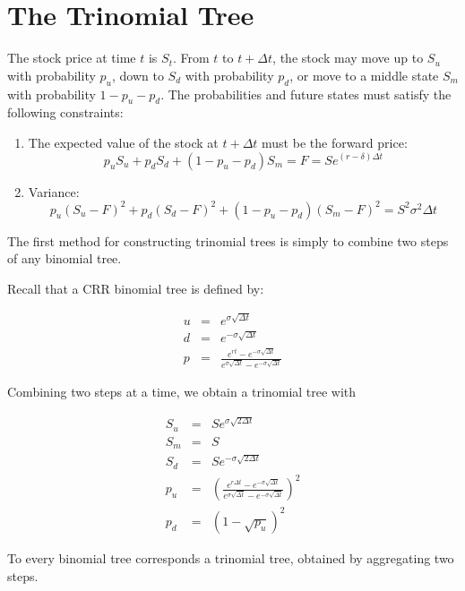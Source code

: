 \documentclass[justified]{tufte-book}
\begin{document}
\hypertarget{the-trinomial-tree}{%
\section{The Trinomial Tree}\label{the-trinomial-tree}}

The stock price at time \(t\) is \(S_t\). From \(t\) to \(t+\Delta t\), the
stock may move up to \(S_u\) with probability \(p_u\), down to \(S_d\) with
probability \(p_d\), or move to a middle state \(S_m\) with probability
\(1-p_u-p_d\). The probabilities and future states must satisfy the
following constraints:

\begin{enumerate}
\def\labelenumi{\arabic{enumi}.}
\item
  The expected value of the stock at \(t+\Delta t\) must be the forward
  price:
  \[p_u S_u + p_d S_d + (1-p_u-p_d) S_m = F = S e^{(r-\delta)\Delta t}\]
\item
  Variance:
  \[p_u (S_u-F)^2 + p_d(S_d-F)^2 +(1-p_u-p_d)(S_m-F)^2 = S^2\sigma^2\Delta t\]
\end{enumerate}

The first method for constructing trinomial trees is simply to combine
two steps of any binomial tree.

Recall that a CRR binomial tree is defined by:

\[\begin{aligned}
    u &=& e^{\sigma \sqrt{\Delta t}} \\
    d &=& e^{-\sigma \sqrt{\Delta t}} \\
    p &=& \frac{e^{rt} - e^{-\sigma \sqrt{\Delta t}}}{e^{\sigma \sqrt{\Delta t}} - e^{-\sigma \sqrt{\Delta t}}}\end{aligned}\]

Combining two steps at a time, we obtain a trinomial tree with

\[\begin{aligned}
    S_u &=& S e^{\sigma \sqrt{2 \Delta t}} \\
    S_m & = & S \\
    S_d &=& S e^{-\sigma \sqrt{2 \Delta t}} \\
    p_u &=& \left( \frac{e^{r \Delta t} - e^{-\sigma \sqrt{\Delta t}}}{e^{\sigma \sqrt{\Delta t}} - e^{-\sigma \sqrt{\Delta t}}} \right)^2 \\
    p_d &=& (1-\sqrt{p_u})^2\end{aligned}\]

To every binomial tree corresponds a trinomial tree, obtained by
aggregating two steps.
\end{document}
